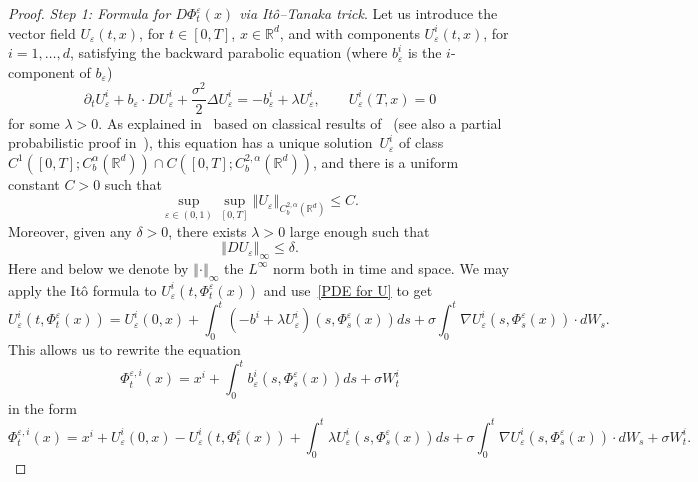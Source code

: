 \documentclass[a4paper,10pt]{article}
\newcommand\1{\mathbbm{1}}
\newcommand{\eps}{\varepsilon}
\numberwithin{equation}{section}
\begin{document}
\begin{proof}
\emph{Step 1: Formula for $D \Phi^{\eps}_t(x)$ via It\^o--Tanaka trick}. Let us introduce the vector field $U_{\eps}(t,x)  $, for $t\in [0,T]$, $x\in\mathbb{R}^{d}$, and with components $U_{\eps}^{i}(t,x)$, for $i=1,\ldots,d$, satisfying the backward parabolic equation (where $b_{\eps}^{i}$ is the $i$-component of
$b_{\eps}$)
\begin{equation}
\partial_t U_{\eps}^{i} + b_{\eps}\cdot DU_{\eps
}^{i}+\frac{\sigma^2}{2}\Delta U_{\eps}^{i}=-b_{\eps}^{i}+\lambda
U_{\eps}^{i},\qquad U_{\eps}^{i}(  T,x)
=0 \label{PDE for U} 
\end{equation}
for some $\lambda >0$. As explained in~\cite[Section~2]{FLAGUBPRI10} based on classical results of~\cite{KRYLOV96} (see also a partial probabilistic proof in~\cite{FLALNM}), this equation has a unique solution~$U_{\eps}^{i}$ of class $C^{1}( [0,T] ;C_{b}^{\alpha}(\mathbb{R}^{d}))  \cap C([0,T];C_{b}^{2,\alpha}(\mathbb{R}^{d}))$, and there is a uniform constant $C>0$ such that
\begin{equation}
\sup_{\eps \in (0,1)} \sup_{[0,T]  }\left\Vert U_{\eps}\right\Vert _{C_{b} 
^{2,\alpha}(  \mathbb{R}^{d})  }\leq
C .\label{uniform estimate on U} 
\end{equation}
Moreover, given any $\delta>0$, there exists $\lambda>0$ large enough such that
\begin{equation}
\left\Vert DU_{\eps}\right\Vert _{\infty}\leq\delta .\label{uniform estimate on U 1/2} 
\end{equation}
Here and below we denote by $\left\Vert \cdot\right\Vert_{\infty}$ the $L^{\infty}$ norm both in time and space. We may apply the It\^{o} formula to $U_{\eps}^{i}(t,\Phi^{\eps}_t(x)  )$ and use~\eqref{PDE for U} to get \begin{equation*}
U_{\eps}^{i} ( t,\Phi^{\eps}_t(x)) =U_{\eps}^{i}(  0,x)  +\int_{0}^{t}(  -b^{i} + \lambda U_{\eps}^{i})  (  s,\Phi^{\eps}_s(x)) ds+\sigma\int_{0}^{t}\nabla U_{\eps}^{i}(  s,\Phi
^{\eps}_s(x) ) \cdot dW_{s} .
\end{equation*}
This allows us to rewrite the equation
\[
\Phi_{t}^{\eps,i}(x)  =x^{i}+\int_{0}^{t}b_{\eps}^{i}(s,\Phi^{\eps}_s(x))  ds+\sigma W_{t}^{i} 
\]
in the form
\begin{equation*}
\Phi^{\eps,i}_{t}(x) =x^{i}+U_{\eps}^{i}(0,x)  -U_{\eps}^{i}(  t,\Phi^{\eps}_t(x) ) + \int_{0}^{t}\lambda U_{\eps}^{i}(s,\Phi^{\eps}_s(x))  ds
+ \sigma\int_{0}^{t}\nabla U_{\eps}^{i}(s,\Phi^{\eps}_s(x)  )  \cdot dW_{s}+\sigma W_{t}^{i} .
\end{equation*}

\end{proof}
\end{document}
